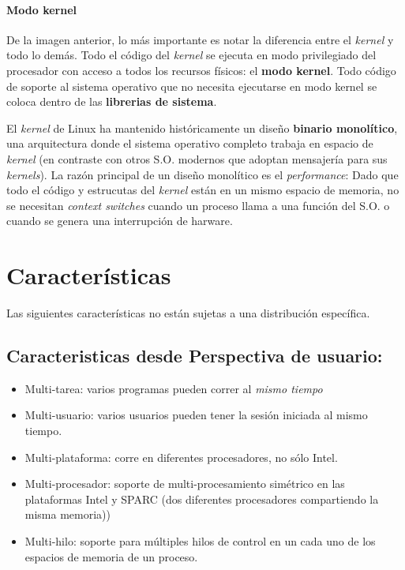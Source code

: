 \documentclass[spanish]{article}
\begin{document}
\paragraph{Modo kernel}De la imagen anterior, lo más importante es notar la diferencia entre el \textit{kernel} y todo lo demás. Todo el código del \textit{kernel} se ejecuta en modo privilegiado del procesador con acceso a todos los recursos físicos: el \textbf{modo kernel}. Todo código de soporte al sistema operativo que no necesita ejecutarse en modo kernel se coloca dentro de las \textbf{librerias de sistema}.

El \textit{kernel} de Linux ha mantenido históricamente un diseño \textbf{binario monolítico}, una arquitectura donde el sistema operativo completo trabaja en espacio de \textit{kernel} (en contraste con otros S.O. modernos que adoptan mensajería para sus \textit{kernels}). La razón principal de un diseño monolítico es el \textit{performance}: Dado que todo el código y estrucutas del \textit{kernel} están en un mismo espacio de memoria, no se necesitan \textit{context switches} cuando un proceso llama a una función del S.O. o cuando se genera una interrupci\'{o}n de harware.


\section{Características}

Las siguientes caracter\'{i}sticas no est\'{a}n sujetas a una distribuci\'{o}n específica.

\subsection{Caracteristicas desde Perspectiva de usuario:}
\begin{itemize}
\item Multi-tarea: varios programas pueden correr al \textit{mismo tiempo}
\item Multi-usuario: varios usuarios pueden tener la sesión iniciada al mismo tiempo.
\item Multi-plataforma: corre en diferentes procesadores, no sólo Intel.
\item Multi-procesador: soporte de multi-procesamiento simétrico en las plataformas Intel y SPARC (dos diferentes procesadores compartiendo la misma memoria))
\item Multi-hilo: soporte para múltiples hilos de control en un cada uno de los espacios de memoria de un proceso.
\end{itemize}
\end{document}
